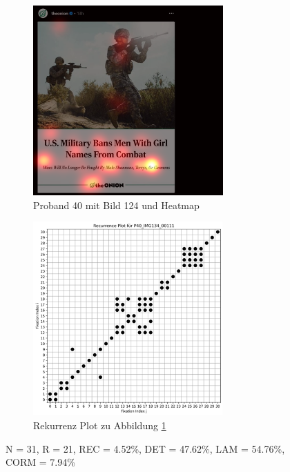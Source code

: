 \documentclass[
    language=german, %
    thesis=seminar, %
    supervisor=postdoc, %
    multiauthor=true, %
    ]{settings/csssa-thesis}
\begin{document}
\begin{figure}[ht]
    \centering
    \begin{subfigure}{0.49\textwidth}
        \centering
        \includegraphics[width=0.8\textwidth]{figures/Bild21.png}
        \caption{Proband 40 mit Bild 124 und Heatmap}\label{fig:Bild18a}
    \end{subfigure}
    \begin{subfigure}{0.49\textwidth}
        \centering
        \includegraphics[width=0.8\textwidth]{figures/Bild22.png}
        \caption{Rekurrenz Plot zu Abbildung \ref{fig:Bild18a}}\label{fig:Bild18b}
    \end{subfigure}\label{fig:Bild18}
    \caption{N = 31, R = 21, REC = 4.52\%, DET = 47.62\%, LAM = 54.76\%, CORM = 7.94\%}
\end{figure}
\end{document}
